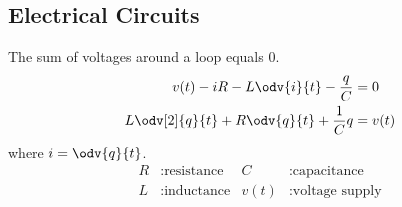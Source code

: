 \documentclass{article}
\begin{document}
\begin{multicols}{3}
    \section*{Electrical Circuits}
    The sum of voltages around a loop equals 0.
    \begin{align*}
        v(t) - iR - L \odv{i}{t} - \frac{q}{C}      & = 0    \\
        L \odv[2]{q}{t} + R\odv{q}{t} + \frac{1}{C}q & = v(t)
    \end{align*}
    where \(\displaystyle i = \odv{q}{t}\).
    \begin{align*}
        R & : \text{resistance} & C    & : \text{capacitance}    \\
        L & : \text{inductance} & v(t) & : \text{voltage supply}
    \end{align*}
\end{multicols}
\end{document}

